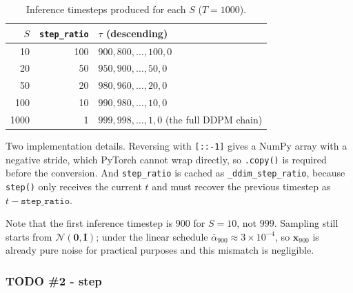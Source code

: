 \documentclass[a4paper]{article} %
\newcommand{\ab}{\bar{\alpha}}
\begin{document}
\begin{table}[H]
\centering
\caption{Inference timesteps produced for each $S$ ($T=1000$).}
\label{tab:ddim_ts}
\begin{tabular}{rrl}
\toprule
$S$ & \texttt{step\_ratio} & $\tau$ (descending) \\
\midrule
10   & 100 & $900, 800, \dots, 100, 0$ \\
20   & 50  & $950, 900, \dots, 50, 0$ \\
50   & 20  & $980, 960, \dots, 20, 0$ \\
100  & 10  & $990, 980, \dots, 10, 0$ \\
1000 & 1   & $999, 998, \dots, 1, 0$ (the full DDPM chain) \\
\bottomrule
\end{tabular}
\end{table}

Two implementation details. Reversing with \texttt{[::-1]} gives a NumPy array with a negative
stride, which PyTorch cannot wrap directly, so \texttt{.copy()} is required before the
conversion. And \texttt{step\_ratio} is cached as \texttt{\_ddim\_step\_ratio}, because
\texttt{step()} only receives the current $t$ and must recover the previous timestep as
$t - \texttt{step\_ratio}$.

Note that the first inference timestep is $900$ for $S=10$, not $999$. Sampling still starts from
$\mathcal{N}(\mathbf{0},\mathbf{I})$; under the linear schedule $\ab_{900}\approx 3\times10^{-4}$, so
$\mathbf{x}_{900}$ is already pure noise for practical purposes and this mismatch is negligible.

\subsubsection{TODO \#2 - step}
\end{document}
